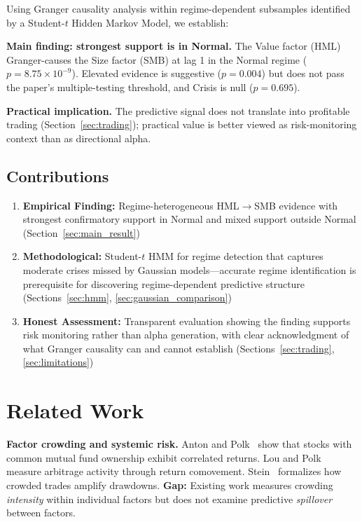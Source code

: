 \documentclass[sigconf]{acmart}
\begin{document}
Using Granger causality analysis within regime-dependent subsamples identified by
a Student-$t$ Hidden Markov Model, we establish:

\textbf{Main finding: strongest support is in Normal.} The Value factor (HML)
Granger-causes the Size factor (SMB) at lag 1 in the Normal regime
($p = 8.75 \times 10^{-9}$). Elevated evidence is suggestive ($p = 0.004$) but
does not pass the paper's multiple-testing threshold, and Crisis is null
($p = 0.695$).

\textbf{Practical implication.} The predictive signal does not translate into
profitable trading (Section~\ref{sec:trading}); practical value is better viewed
as risk-monitoring context than as directional alpha.

\subsection{Contributions}

\begin{enumerate}
    \item \textbf{Empirical Finding:} Regime-heterogeneous HML$\to$SMB evidence with
    strongest confirmatory support in Normal and mixed support outside Normal
    (Section~\ref{sec:main_result})

    \item \textbf{Methodological:} Student-$t$ HMM for regime detection that captures
    moderate crises missed by Gaussian models---accurate regime identification is
    prerequisite for discovering regime-dependent predictive structure
    (Sections~\ref{sec:hmm}, \ref{sec:gaussian_comparison})

    \item \textbf{Honest Assessment:} Transparent evaluation showing the finding
    supports risk monitoring rather than alpha generation, with clear acknowledgment
    of what Granger causality can and cannot establish
    (Sections~\ref{sec:trading}, \ref{sec:limitations})
\end{enumerate}

\section{Related Work}

\textbf{Factor crowding and systemic risk.}
Anton and Polk~\cite{anton2014connected} show that stocks with common mutual fund
ownership exhibit correlated returns. Lou and Polk~\cite{lou2022comomentum} measure
arbitrage activity through return comovement. Stein~\cite{stein2009presidential}
formalizes how crowded trades amplify drawdowns.
\textbf{Gap:} Existing work measures crowding \emph{intensity} within individual
factors but does not examine predictive \emph{spillover} between factors.
\end{document}
